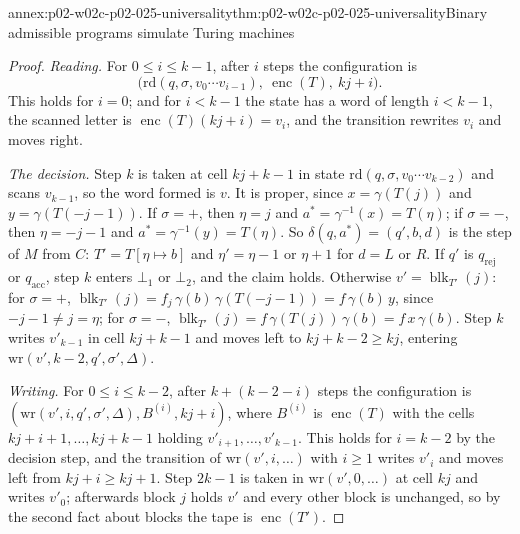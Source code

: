 \begin{annexitem}{annex:p02-w02c-p02-025-universality}{thm:p02-w02c-p02-025-universality}{Binary admissible programs simulate Turing machines}
\begin{proof}
\emph{Reading.}  For \(0\leq i\leq k-1\), after \(i\) steps the configuration is
\[
 \bigl(\mathrm{rd}(q,\sigma,v_0\cdots v_{i-1}),\ \operatorname{enc}(T),\
 kj+i\bigr).
\]
This
holds for \(i=0\); and for \(i<k-1\) the state has a word of length
\(i<k-1\), the scanned letter is \(\operatorname{enc}(T)(kj+i)=v_i\), and the
transition rewrites \(v_i\) and moves right.

\emph{The decision.}  Step \(k\) is taken at cell \(kj+k-1\) in state
\(\mathrm{rd}(q,\sigma,v_0\cdots v_{k-2})\) and scans \(v_{k-1}\), so the word
formed is \(v\).  It is proper, since \(x=\gamma(T(j))\) and
\(y=\gamma(T(-j-1))\).  If \(\sigma=+\), then \(\eta=j\) and
\(a^{*}=\gamma^{-1}(x)=T(\eta)\); if \(\sigma=-\), then \(\eta=-j-1\) and
\(a^{*}=\gamma^{-1}(y)=T(\eta)\).  So \(\delta(q,a^{*})=(q',b,d)\) is the step of
\(M\) from \(C\): \(T'=T[\eta\mapsto b]\) and \(\eta'=\eta-1\) or \(\eta+1\) for
\(d=L\) or \(R\).  If \(q'\) is \(q_{\mathrm{rej}}\) or \(q_{\mathrm{acc}}\), step
\(k\) enters \(\bot_1\) or \(\bot_2\), and the claim holds.  Otherwise
\(v'=\operatorname{blk}_{T'}(j)\): for \(\sigma=+\),
\(\operatorname{blk}_{T'}(j)=f_j\,\gamma(b)\,\gamma(T(-j-1))=f\,\gamma(b)\,y\), since
\(-j-1\neq j=\eta\); for \(\sigma=-\),
\(\operatorname{blk}_{T'}(j)=f\,\gamma(T(j))\,\gamma(b)=f\,x\,\gamma(b)\).  Step \(k\)
writes \(v'_{k-1}\) in cell \(kj+k-1\) and moves left to
\(kj+k-2\geq kj\), entering \(\mathrm{wr}(v',k-2,q',\sigma',\Delta)\).

\emph{Writing.}  For \(0\leq i\leq k-2\), after \(k+(k-2-i)\) steps the
configuration is \((\mathrm{wr}(v',i,q',\sigma',\Delta),B^{(i)},kj+i)\), where
\(B^{(i)}\) is \(\operatorname{enc}(T)\) with the cells
\(kj+i+1,\ldots,kj+k-1\) holding \(v'_{i+1},\ldots,v'_{k-1}\).  This holds for
\(i=k-2\) by the decision step, and the transition of
\(\mathrm{wr}(v',i,\ldots)\) with \(i\geq1\) writes \(v'_i\) and moves left from
\(kj+i\geq kj+1\).  Step \(2k-1\) is taken in \(\mathrm{wr}(v',0,\ldots)\) at cell
\(kj\) and writes \(v'_0\); afterwards block \(j\) holds \(v'\) and every other
block is unchanged, so by the second fact about blocks the tape is
\(\operatorname{enc}(T')\).


\end{proof}
\end{annexitem}
